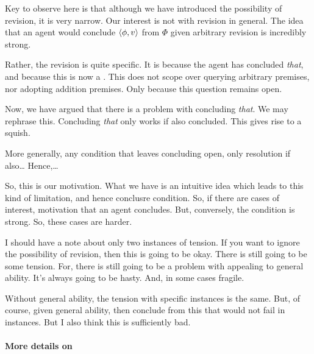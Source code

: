 \begin{note}
  Key to observe here is that although we have introduced the possibility of revision, it is very narrow.
  Our interest is not with revision in general.
  The idea that an agent would conclude \(\langle \phi, v \rangle\) from \(\Phi\) given arbitrary revision is incredibly strong.

  Rather, the revision is quite specific.
  It is because the agent has concluded \emph{that}, and because this is now a \requ{}.
  This does not scope over querying arbitrary premises, nor adopting addition premises.
  Only because this question remains open.
\end{note}

\begin{note}
  Now, we have argued that there is a problem with concluding \emph{that}.
  We may rephrase this.
  Concluding \emph{that} only works if also concluded.
  This gives rise to a squish.

  More generally, any condition that leaves concluding open, only resolution if also\dots
  Hence,\dots
\end{note}

\begin{note}[Closure]
  So, this is our motivation.
  What we have is an intuitive idea which leads to this kind of limitation, and hence conclusre condition.
  So, if there are cases of interest, motivation that an agent concludes.
  But, conversely, the condition is strong.
  So, these cases are harder.
\end{note}


\begin{note}
  {
    \color{red}
    I should have a note about only two instances of tension.
    If you want to ignore the possibility of revision, then this is going to be okay.
    There is still going to be some tension.
    For, there is still going to be a problem with appealing to general ability.
    It's always going to be hasty.
    And, in some cases fragile.

    Without general ability, the tension with specific instances is the same.
    But, of course, given general ability, then conclude from this that would not fail in instances.
    But I also think this is sufficiently bad.
  }
\end{note}

\paragraph{More details on \iCS{}}

